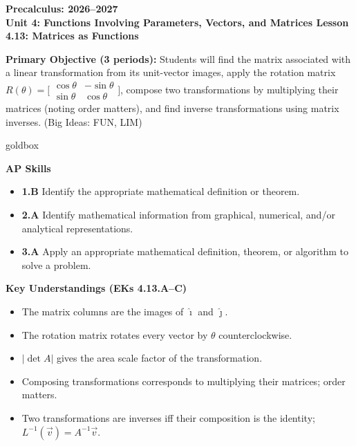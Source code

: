 \documentclass[10pt]{article}
\newcommand{\CourseName}{Precalculus}
\newcommand{\SchoolYear}{2026--2027}
\newcommand{\UnitNumberName}{Unit 4: Functions Involving Parameters, Vectors, and Matrices \quad}
\newcommand{\LessonNumberName}{Lesson 4.13: Matrices as Functions}
\begin{document}
\begin{center}
    {\Large\bfseries \CourseName: \SchoolYear \\
    {\small\bfseries \UnitNumberName \LessonNumberName}}
\end{center}

\begin{tcolorbox}[colback=sky, colframe=navy, boxrule=0.9pt, arc=2mm,
    left=2mm, right=2mm, top=1.5mm, bottom=1.5mm]
    \textbf{Primary Objective (3 periods):} Students will find the matrix associated with a linear
    transformation from its unit-vector images, apply the rotation matrix
    $R(\theta) = \bigl[\begin{smallmatrix}\cos\theta & -\sin\theta \\ \sin\theta & \cos\theta\end{smallmatrix}\bigr]$,
    compose two transformations by multiplying their matrices (noting order matters), and find
    inverse transformations using matrix inverses.
    (Big Ideas: FUN, LIM)
\end{tcolorbox}

\renewcommand{\arraystretch}{1.6}
\begin{skillbox}{goldbox}
\begin{minipage}[t]{0.48\linewidth}\vspace{0pt}
\textbf{AP Skills}
\begin{itemize}[leftmargin=1.4em, itemsep=2pt]
  \item \textbf{1.B} Identify the appropriate mathematical definition or theorem.
  \item \textbf{2.A} Identify mathematical information from graphical, numerical, and/or analytical representations.
  \item \textbf{3.A} Apply an appropriate mathematical definition, theorem, or algorithm to solve a problem.
\end{itemize}
\end{minipage}\hfill
\begin{minipage}[t]{0.48\linewidth}\vspace{0pt}
\textbf{Key Understandings (EKs 4.13.A--C)}
\begin{itemize}[leftmargin=1.4em, itemsep=2pt]
  \item The matrix columns are the images of $\hat{\imath}$ and $\hat{\jmath}$.
  \item The rotation matrix rotates every vector by $\theta$ counterclockwise.
  \item $|\det A|$ gives the area scale factor of the transformation.
  \item Composing transformations corresponds to multiplying their matrices; order matters.
  \item Two transformations are inverses iff their composition is the identity; $L^{-1}(\vec v) = A^{-1}\vec v$.
\end{itemize}
\end{minipage}
\end{skillbox}
\end{document}
